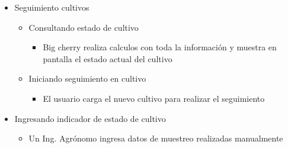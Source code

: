 \begin{itemize}
\begin{itemize}
 \end{itemize}
 \item Seguimiento cultivos
 \begin{itemize}
  \item Consultando estado de cultivo
    \begin{itemize}
      \item Big cherry realiza calculos con toda la informaci\'on  y muestra en pantalla el estado actual del cultivo
    \end{itemize}
  \item Iniciando seguimiento en cultivo
  \begin{itemize}
	\item El usuario carga el nuevo cultivo para realizar el seguimiento
    \end{itemize}
  \end{itemize}
  \item Ingresando indicador de estado de cultivo
  \begin{itemize}
   \item Un Ing. Agr\'onomo ingresa datos de muestreo realizadas manualmente
  \end{itemize}


\end{itemize}
